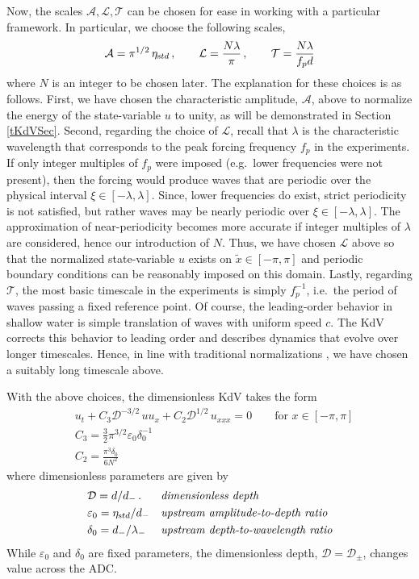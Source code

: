 \documentclass[11pt]{article}
\newcommand{\eps}{\varepsilon}
\newcommand{\freqp}{f_p}
\newcommand{\etastd}{\eta_{\text std}}
\newcommand{\depth}{d}
\newcommand{\dup}{\depth_{-}}
\newcommand{\lam}{\lambda}
\newcommand{\lamup}{\lam_{-}}
\newcommand{\lamfac}{N}
\newcommand{\drat}{\mathcal{D}}
\newcommand{\dratupdn}{\drat_{\pm}}
\newcommand{\ampscale}{\mathcal{A}}
\newcommand{\lengthscale}{\mathcal{L}}
\newcommand{\timescale}{\mathcal{T}}
\newcommand{\epsup}{\eps_0}
\newcommand{\delup}{\delta_0}
\begin{document}
Now, the scales $\ampscale, \lengthscale, \timescale$ can be chosen for ease in working with a particular framework. In particular, we choose the following scales,
\begin{align}
\ampscale = \pi^{1/2} \, \etastd \, , \qquad
\lengthscale = \frac{\lamfac \lam}{\pi} \, , \qquad
\timescale = \frac{\lamfac \lam}{\freqp \depth}
\end{align}
where $\lamfac$ is an integer to be chosen later. 
The explanation for these choices is as follows. First, we have chosen the characteristic amplitude, $\ampscale$, above to normalize the energy of the state-variable $u$ to unity, as will be demonstrated in Section \ref{tKdVSec}. Second, regarding the choice of $\lengthscale$, recall that $\lam$ is the characteristic wavelength that corresponds to the peak forcing frequency $\freqp$ in the experiments. If only integer multiples of $\freqp$ were imposed (e.g.~lower frequencies were not present), then the forcing would produce waves that are periodic over the physical interval $\xi \in [-\lam,\lam]$. Since, lower frequencies do exist, strict periodicity is not satisfied, but rather waves may be nearly periodic over $\xi \in [-\lam,\lam]$. The approximation of near-periodicity becomes more accurate if integer multiples of $\lam$ are considered, hence our introduction of $\lamfac$. Thus, we have chosen $\lengthscale$ above so that the normalized state-variable $u$ exists on $\tilde{x} \in [-\pi, \pi]$ and periodic boundary conditions can be reasonably imposed on this domain. Lastly, regarding $\timescale$, the most basic timescale in the experiments is simply $\freqp^{-1}$, i.e.~the period of waves passing a fixed reference point. Of course, the leading-order behavior in shallow water is simple translation of waves with uniform speed $c$. The KdV corrects this behavior to leading order and describes dynamics that evolve over longer timescales. Hence, in line with traditional normalizations \cite{johnson1997modern}, we have chosen a suitably long timescale above.


With the above choices, the dimensionless KdV takes the form
\begin{align}
\label{dimlessKdV}
&u_t + C_3 \drat^{-3/2} \, u u_x + C_2 \drat^{1/2} \, u_{xxx} = 0
\qquad \text{for } x \in [-\pi,\pi] \\
&C_3 = \frac{3}{2} \pi^{3/2} \epsup \delup^{-1}  \\
&C_2 = \frac{\pi^3 \delup}{6 \lamfac^2} 
\end{align}
where dimensionless parameters are given by
\begin{align}
&\drat = {\depth}/{\dup} \, .
&&\mbox{\em dimensionless depth} \\
&\epsup = \etastd / \dup
&&\mbox{\em upstream amplitude-to-depth ratio} \\
&\delup = \dup / \lamup
&&\mbox{\em upstream depth-to-wavelength ratio}
\end{align}
While $\epsup$ and $\delup$ are fixed parameters, the dimensionless depth, $\drat = \dratupdn$, changes value across the ADC.
\end{document}
